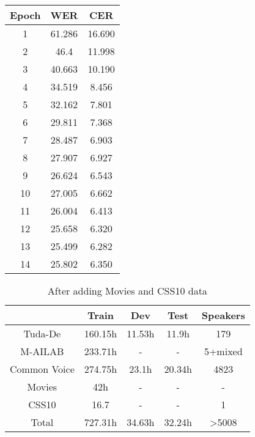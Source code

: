 \begin{table}[!ht]
	\centering
	\begin{tabular}{|c|c|c|}
		\hline
		Epoch & WER    & CER    \\ \hline
		1     & 61.286 & 16.690 \\ \hline
		2     & 46.4 & 11.998 \\ \hline
		3     & 40.663 & 10.190 \\ \hline
		4     & 34.519 & 8.456  \\ \hline
		5     & 32.162 & 7.801  \\ \hline
		6     & 29.811 & 7.368  \\ \hline
		7     & 28.487 & 6.903  \\ \hline
		8     & 27.907 & 6.927  \\ \hline
		9     & 26.624 & 6.543  \\ \hline
		10    & 27.005 & 6.662  \\ \hline
		11    & 26.004 & 6.413  \\ \hline
		12    & 25.658 & 6.320  \\ \hline
		13    & 25.499 & 6.282  \\ \hline
		14    & 25.802 & 6.350  \\ \hline
	\end{tabular}
	\caption{}
	\label{table:train14}
\end{table}

\begin{table}
\centering
\begin{tabular}{ | c | c | c | c | c | } 
	\hline
	& Train   & Dev    & Test   & Speakers  \\ 
	\hline
	Tuda-De      & 160.15h & 11.53h & 11.9h  & 179       \\
	\hline
	M-AILAB      & 233.71h & -      &   -    & 5+mixed   \\ 
	\hline
	Common Voice & 274.75h & 23.1h  & 20.34h & 4823      \\
	\hline
	Movies       & 42h     & -      & -      & -         \\
	\hline
	CSS10        & 16.7    & -      & -      & 1         \\
	\hline
	Total        & 727.31h & 34.63h & 32.24h & >5008     \\
	\hline
\end{tabular}
\caption{After adding Movies and CSS10 data}
\label{table:data19}
\end{table}


